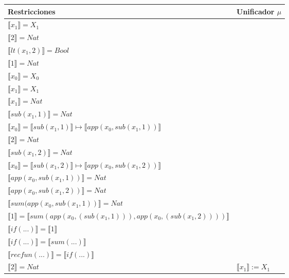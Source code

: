 \begin{exercise}
\begin{description}
\begin{center}
\begin{longtable}{ | l | l | }
                      \hline
                      Restricciones & Unificador $\mu$ \\ 
                        \hline
                        $ \llbracket x_1 \rrbracket = X_1$ & \\
                        $ \llbracket 2 \rrbracket = Nat$  & \\
                        $ \llbracket lt(x_1 , 2) \rrbracket = Bool$ & \\
                        $ \llbracket 1 \rrbracket = Nat$ & \\
                        $ \llbracket x_0 \rrbracket = X_0$ & \\
                        $ \llbracket x_1 \rrbracket = X_1$ & \\
                        $ \llbracket x_1 \rrbracket = Nat$ & \\
                        $ \llbracket sub(x_1,1) \rrbracket = Nat$ & \\
                        $ \llbracket x_0 \rrbracket =  \llbracket sub(x_1,1) \rrbracket \mapsto  \llbracket app(x_0, sub(x_1,1)) \rrbracket$ & \\
                        $ \llbracket 2 \rrbracket = Nat$ & \\
                        $ \llbracket sub(x_1,2) \rrbracket = Nat$ & \\
                        $ \llbracket x_0 \rrbracket =  \llbracket sub(x_1,2) \rrbracket \mapsto  \llbracket app(x_0, sub(x_1,2)) \rrbracket$ & \\
                        $ \llbracket app(x_0, sub(x_1,1)) \rrbracket = Nat$ & \\
                        $ \llbracket app(x_0, sub(x_1,2)) \rrbracket = Nat$ & \\
                        $ \llbracket sum(app(x_0, sub(x_1,1)) \rrbracket = Nat$ & \\
                        $ \llbracket 1 \rrbracket =  \llbracket sum(app(x_0, (sub(x_1,1))), app(x_0, (sub(x_1,2)))) \rrbracket$ & \\
                        $ \llbracket if(...) \rrbracket =  \llbracket 1 \rrbracket$ & \\
                        $ \llbracket if(...) \rrbracket =  \llbracket sum(...) \rrbracket$ & \\
                        $ \llbracket recfun(...) \rrbracket =  \llbracket if(...) \rrbracket$ & \\
                      \hline
                        $ \llbracket 2 \rrbracket = Nat$  & $ \llbracket x_1 \rrbracket := X_1$ \\

\end{longtable}
\end{center}
\end{description}
\end{exercise}

